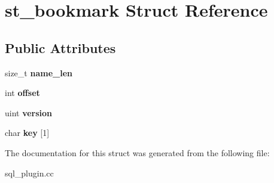 \hypertarget{structst__bookmark}{}\section{st\+\_\+bookmark Struct Reference}
\label{structst__bookmark}
\subsection*{Public Attributes}
\begin{DoxyCompactItemize}
\item 
\mbox{\label{structst__bookmark_aae3eb3ccc4e104dc9ac59dabf125b6c2}} 
size\+\_\+t {\bfseries name\+\_\+len}
\item 
\mbox{\label{structst__bookmark_a0da3af23a60b897227068288802aa900}} 
int {\bfseries offset}
\item 
\mbox{\label{structst__bookmark_a71af182c9eb5735ce3b955505a8081ec}} 
uint {\bfseries version}
\item 
\mbox{\label{structst__bookmark_a52ae413746056bd1847e789665dc1631}} 
char {\bfseries key} \mbox{[}1\mbox{]}
\end{DoxyCompactItemize}


The documentation for this struct was generated from the following file\+:\begin{DoxyCompactItemize}
\item 
sql\+\_\+plugin.\+cc\end{DoxyCompactItemize}
